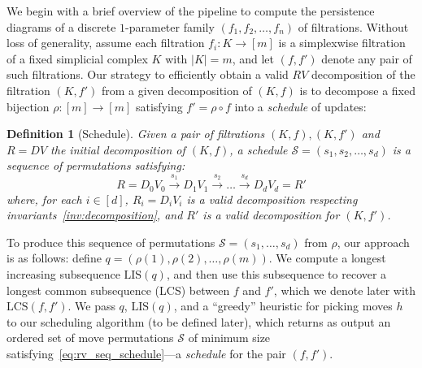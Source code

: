 \documentclass[sn-mathphys]{sn-jnl}
\newtheorem{definition}{Definition}
\begin{document}
We begin with a brief overview of the pipeline to compute the persistence diagrams of a discrete $1$-parameter family $(f_1, f_2, \dots, f_n)$ of filtrations. 
Without loss of generality, assume each filtration $f_i : K \rightarrow [m]$ is a simplexwise filtration of a fixed simplicial complex $K$ with $\lvert K \rvert =m$, and let $(f, f')$ denote any pair of such filtrations.  
Our strategy to efficiently obtain a valid $RV$ decomposition of the filtration $(K,f')$ from a given decomposition of $(K, f)$ is to decompose a fixed bijection $\rho : [m] \to [m]$ satisfying $f' = \rho \circ f$ into a \emph{schedule} of updates: 
\begin{definition}[Schedule]\label{def:schedule}
Given a pair of filtrations $(K, f), (K,f')$ 
and $R = DV$ the initial decomposition of $(K, f)$, a \emph{schedule}  $\mathcal{S} = (s_1, s_2, \dots, s_d )$ is a sequence of permutations  satisfying: 
	\begin{equation}\label{eq:rv_seq_schedule}
   		R = D_0 V_0 \overset{s_1}{\to} D_1 V_{1} \overset{s_2}{\to} \dots \overset{s_d}{\to} D_d V_{d} = R'
   	\end{equation}
   	where, for each $i \in [d]$, $R_i = D_i V_i$ is a valid decomposition respecting invariants~\ref{inv:decomposition}, and $R'$ is a valid decomposition for $(K,f')$.
\end{definition}
\noindent
To produce this sequence of permutations $\mathcal{S} = (s_1, \dots, s_d)$ from $\rho$, our approach is as follows:
define $q = (\rho(1), \rho(2), \ldots, \rho(m) )$. 
We compute a longest increasing subsequence $\mathrm{LIS}(q)$, and then use this subsequence to recover a longest common subsequence (LCS) between $f$ and $f'$, which we denote later with $\mathrm{LCS}(f, f')$. 
We pass $q$, $\mathrm{LIS}(q)$, and a ``greedy'' heuristic for picking moves $h$ to our scheduling algorithm (to be defined later), which returns as output an ordered set of move permutations  $\mathcal{S}$ of minimum size satisfying~\eqref{eq:rv_seq_schedule}---a \emph{schedule} for the pair $(f, f')$.
\end{document}

